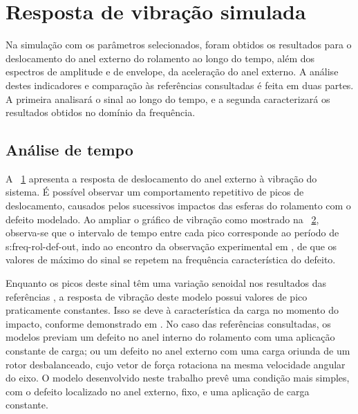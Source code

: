 \documentclass[12pt,oneside,english,brazil,lmodern,siglas,simbolos,cite=num]{ucsmonograph}
\begin{document}
	\section{Resposta de vibração simulada}
	Na simulação com os parâmetros selecionados, foram obtidos os resultados para o deslocamento do anel externo do rolamento ao longo do tempo, além dos espectros de amplitude e de envelope, da aceleração do anel externo.
	A análise destes indicadores e comparação às referências consultadas é feita em duas partes.
	A primeira analisará o sinal ao longo do tempo, e a segunda caracterizará os resultados obtidos no domínio da frequência.
	
	\subsection{Análise de tempo} \label{sec:res:analise-tempo}
	A \figurename\ \ref{fig:modelo-ext-tempo} apresenta a resposta de deslocamento do anel externo à vibração do sistema.
	É possível observar um comportamento repetitivo de picos de deslocamento, causados pelos sucessivos impactos das esferas do rolamento com o defeito modelado.
	Ao ampliar o gráfico de vibração como mostrado na \figurename\ \ref{fig:modelo-ext-tempo-01-seg}, observa-se que o intervalo de tempo entre cada pico corresponde ao período de \gls{s:freq-rol-def-out}, indo ao encontro da observação experimental em \cite{cong:2013}, de que os valores de máximo do sinal se repetem na frequência característica do defeito.
	
	\begin{figure}[h]
		\label{fig:modelo-ext-tempo}
	\end{figure}

	\begin{figure}[h]
		\label{fig:modelo-ext-tempo-01-seg}
	\end{figure}
	
	Enquanto os picos deste sinal têm uma variação senoidal nos resultados das referências \cite{mcfadden:1984,sassi:2007,cong:2013,patil:2010}, a resposta de vibração deste modelo possui valores de pico praticamente constantes.
	Isso se deve à característica da carga no momento do impacto, conforme demonstrado em \cite{mcfadden:1984,cong:2013}.
	No caso das referências consultadas, os modelos previam um defeito no anel interno do rolamento com uma aplicação constante de carga; ou um defeito no anel externo com uma carga oriunda de um rotor desbalanceado, cujo vetor de força rotaciona na mesma velocidade angular do eixo.
	O modelo desenvolvido neste trabalho prevê uma condição mais simples, com o defeito localizado no anel externo, fixo, e uma aplicação de carga constante.
	
\end{document}
